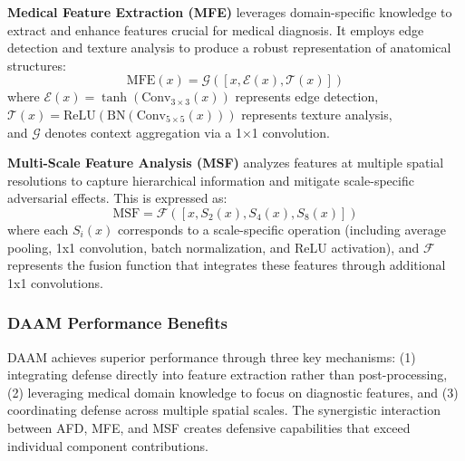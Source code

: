 \documentclass[preprint,12pt]{elsarticle}
\begin{document}
\textbf{Medical Feature Extraction (MFE)} leverages domain-specific knowledge to extract and enhance features crucial for medical diagnosis\cite{Woo18}. It employs edge detection and texture analysis to produce a robust representation of anatomical structures:
\begin{equation}
\text{MFE}(x) = \mathcal{G}([x, \mathcal{E}(x), \mathcal{T}(x)])
\end{equation}
where $\mathcal{E}(x) = \tanh(\text{Conv}_{3 \times 3}(x))$ represents edge detection, \\
$\mathcal{T}(x) = \text{ReLU}(\text{BN}(\text{Conv}_{5 \times 5}(x)))$ represents texture analysis, \\
and $\mathcal{G}$ denotes context aggregation via a 1×1 convolution.

\textbf{Multi-Scale Feature Analysis (MSF)} analyzes features at multiple spatial resolutions to capture hierarchical information and mitigate scale-specific adversarial effects\cite{Rossolini24}. This is expressed as:
\begin{equation}
\text{MSF} = \mathcal{F}([x, S_2(x), S_4(x), S_8(x)])
\end{equation}
where each $S_i(x)$ corresponds to a scale-specific operation (including average pooling, 1x1 convolution, batch normalization, and ReLU activation), and $\mathcal{F}$ represents the fusion function that integrates these features through additional 1x1 convolutions.

\subsubsection{DAAM Performance Benefits}
DAAM achieves superior performance through three key mechanisms: (1) integrating defense directly into feature extraction rather than post-processing, (2) leveraging medical domain knowledge to focus on diagnostic features, and (3) coordinating defense across multiple spatial scales. The synergistic interaction between AFD, MFE, and MSF creates defensive capabilities that exceed individual component contributions.
\end{document}
